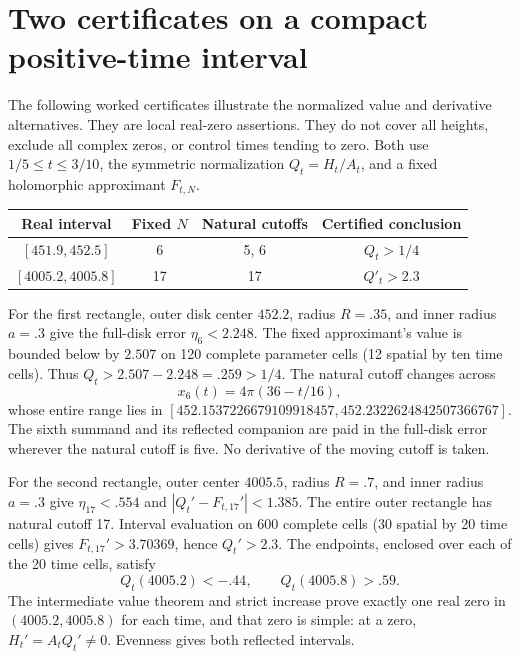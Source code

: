 \documentclass[11pt]{article}
\numberwithin{equation}{section}
\theoremstyle{definition}
\theoremstyle{remark}
\begin{document}
\section{Two certificates on a compact positive-time interval}
\label{app:compact-certificates}

The following worked certificates illustrate the normalized value and
derivative alternatives.  They are local real-zero assertions.  They do
not cover all heights, exclude all complex zeros, or control times tending
to zero.  Both use \(1/5\le t\le3/10\), the symmetric normalization
\(Q_t=H_t/A_t\), and a fixed holomorphic approximant \(F_{t,N}\).

\begin{center}
\begin{tabular}{c|c|c|c}
Real interval & Fixed \(N\) & Natural cutoffs & Certified conclusion\\
\hline
\([451.9,452.5]\) & 6 & 5, 6 & \(Q_t>1/4\)\\
\([4005.2,4005.8]\) & 17 & 17 & \(Q'_t>2.3\)
\end{tabular}
\end{center}

For the first rectangle, outer disk center \(452.2\), radius \(R=.35\),
and inner radius \(a=.3\) give the full-disk error
\(\eta_6<2.248\).  The fixed approximant's value is bounded below by
\(2.507\) on 120 complete parameter cells (12 spatial by ten time cells).
Thus \(Q_t>2.507-2.248=.259>1/4\).  The natural cutoff changes across
\[
 x_6(t)=4\pi(36-t/16),
\]
whose entire range lies in
\([452.1537226679109918457,452.2322624842507366767]\).
The sixth summand and its reflected companion are paid in the full-disk
error wherever the natural cutoff is five.  No derivative of the moving
cutoff is taken.

For the second rectangle, outer center \(4005.5\), radius \(R=.7\),
and inner radius \(a=.3\) give \(\eta_{17}<.554\) and
\(|Q_t'-F_{t,17}'|<1.385\).  The entire outer rectangle has natural
cutoff 17.  Interval evaluation on 600 complete cells (30 spatial by
20 time cells) gives \(F_{t,17}'>3.70369\), hence \(Q_t'>2.3\).
The endpoints, enclosed over each of the 20 time cells, satisfy
\[
 Q_t(4005.2)<-.44,\qquad Q_t(4005.8)>.59.
\]
The intermediate value theorem and strict increase prove exactly one real
zero in \((4005.2,4005.8)\) for each time, and that zero is simple:
at a zero, \(H_t'=A_tQ_t'\ne0\).  Evenness gives both reflected
intervals.
\end{document}
